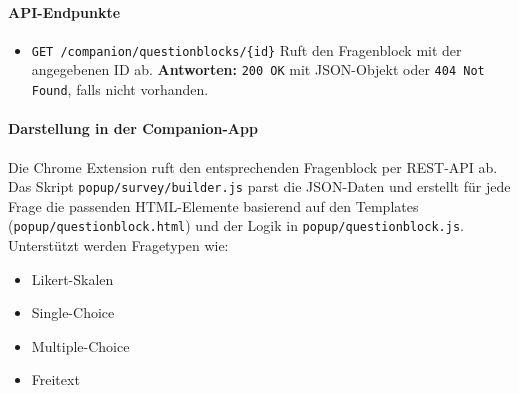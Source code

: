 \documentclass[12pt,a4paper]{report}
\begin{document}
\paragraph{API-Endpunkte}
\begin{itemize}
  \item \texttt{GET /companion/questionblocks/\{id\}}
        Ruft den Fragenblock mit der angegebenen ID ab.
        \textbf{Antworten:} \texttt{200 OK} mit JSON-Objekt oder \texttt{404 Not Found}, falls nicht vorhanden.
\end{itemize}

\paragraph{Darstellung in der Companion-App}
Die Chrome Extension ruft den entsprechenden Fragenblock per REST-API ab.
Das Skript \texttt{popup/survey/builder.js} parst die JSON-Daten und erstellt für jede Frage die passenden HTML-Elemente
basierend auf den Templates (\texttt{popup/questionblock.html}) und der Logik in \texttt{popup/questionblock.js}.
Unterstützt werden Fragetypen wie:
\begin{itemize}
  \item Likert-Skalen
  \item Single-Choice
  \item Multiple-Choice
  \item Freitext
\end{itemize}
\end{document}
